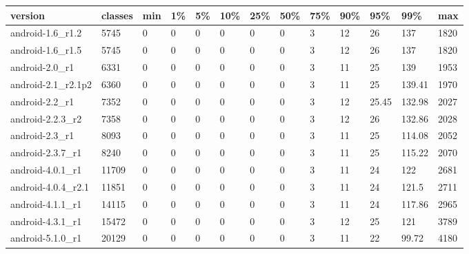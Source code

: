 \begin{tabular}{|l|l|l|l|l|l|l|l|l|l|l|l|l|}
\hline
version&classes&min&1\%&5\%&10\%&25\%&50\%&75\%&90\%&95\%&99\%&max\\
\hline
android-1.6\_r1.2&5745&0&0&0&0&0&0&3&12&26&137&1820\\
\hline
android-1.6\_r1.5&5745&0&0&0&0&0&0&3&12&26&137&1820\\
\hline
android-2.0\_r1&6331&0&0&0&0&0&0&3&11&25&139&1953\\
\hline
android-2.1\_r2.1p2&6360&0&0&0&0&0&0&3&11&25&139.41&1970\\
\hline
android-2.2\_r1&7352&0&0&0&0&0&0&3&12&25.45&132.98&2027\\
\hline
android-2.2.3\_r2&7358&0&0&0&0&0&0&3&12&26&132.86&2028\\
\hline
android-2.3\_r1&8093&0&0&0&0&0&0&3&11&25&114.08&2052\\
\hline
android-2.3.7\_r1&8240&0&0&0&0&0&0&3&11&25&115.22&2070\\
\hline
android-4.0.1\_r1&11709&0&0&0&0&0&0&3&11&24&122&2681\\
\hline
android-4.0.4\_r2.1&11851&0&0&0&0&0&0&3&11&24&121.5&2711\\
\hline
android-4.1.1\_r1&14115&0&0&0&0&0&0&3&11&24&117.86&2965\\
\hline
android-4.3.1\_r1&15472&0&0&0&0&0&0&3&12&25&121&3789\\
\hline
android-5.1.0\_r1&20129&0&0&0&0&0&0&3&11&22&99.72&4180\\
\hline
\end{tabular}
